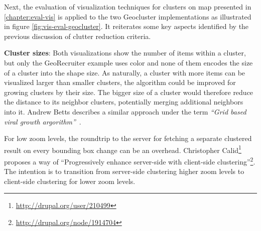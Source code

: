 Next, the evaluation of visualization techniques for clusters on map presented in \ref{chapter:eval-vis} is applied to the two Geocluster implementations as illustrated in figure \ref{fig:vis-eval-geocluster}. It reiterates some key aspects identified by the previous discussion of clutter reduction criteria.

\textbf{Cluster sizes}: Both visualizations show the number of items within a cluster, but only the GeoRecruiter example uses color and none of them encodes the size of a cluster into the shape size. As naturally, a cluster with more items can be visualized larger than smaller clusters, the algorithm could be improved for growing clusters by their size. The bigger size of a cluster would therefore reduce the distance to its neighbor clusters, potentially merging additional neighbors into it. Andrew Betts describes a similar approach under the term \textit{``Grid based viral growth argorithm''}~\cite{web:clustering-google}.

For low zoom levels, the roundtrip to the server for fetching a separate clustered result on every bounding box change can be an overhead. Christopher Calid\footnote{\url{http://drupal.org/user/210499}} proposes a way of ``Progressively enhance server-side with client-side clustering''\footnote{\url{http://drupal.org/node/1914704}}. The intention is to transition from server-side clustering higher zoom levels to client-side clustering for lower zoom levels.



